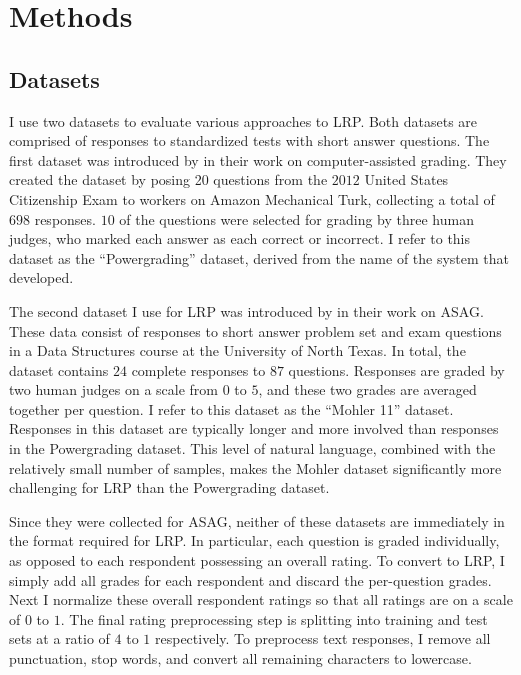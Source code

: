 \section{Methods}
\subsection{Datasets}
I use two datasets to evaluate various approaches to LRP. Both datasets are comprised of responses to standardized tests with short answer questions. The first dataset was introduced by \citet{basu2013powergrading} in their work on computer-assisted grading. They created the dataset by posing 20 questions from the $2012$ United States Citizenship Exam to workers on Amazon Mechanical Turk, collecting a total of $698$ responses. $10$ of the questions were selected for grading by three human judges, who marked each answer as each correct or incorrect. I refer to this dataset as the ``Powergrading'' dataset, derived from the name of the system that  \citet{basu2013powergrading} developed.

The second dataset I use for LRP was introduced by \citet{mohler2011learning} in their work on ASAG. These data consist of responses to short answer problem set and exam questions in a Data Structures course at the University of North Texas. In total, the dataset contains $24$ complete responses to $87$ questions. Responses are graded by two human judges on a scale from $0$ to $5$, and these two grades are averaged together per question. I refer to this dataset as the ``Mohler 11'' dataset. Responses in this dataset are typically longer and more involved than responses in the Powergrading dataset. This level of natural language, combined with the relatively small number of samples, makes the Mohler dataset significantly more challenging for LRP than the Powergrading dataset.

Since they were collected for ASAG, neither of these datasets are immediately in the format required for LRP. In particular, each question is graded individually, as opposed to each respondent possessing an overall rating. To convert to LRP, I simply add all grades for each respondent and discard the per-question grades. Next I normalize these overall respondent ratings so that all ratings are on a scale of $0$ to $1$. The final rating preprocessing step is splitting into training and test sets at a ratio of $4$ to $1$ respectively. To preprocess text responses, I remove all punctuation, stop words, and convert all remaining characters to lowercase.

